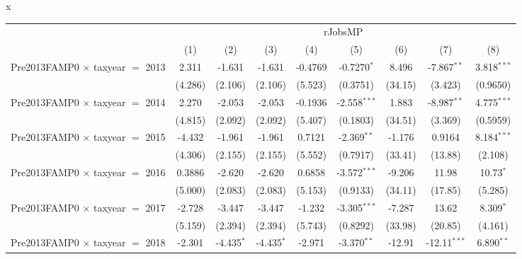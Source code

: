 x
\begingroup
\centering
\begin{tabular}{lcccccccc}
   \toprule
    & \multicolumn{8}{c}{rJobsMP}\\
                                           & (1)           & (2)           & (3)           & (4)           & (5)            & (6)           & (7)            & (8)\\  
   \midrule 
   Pre2013FAMP0 $\times$ taxyear $=$ 2013  & 2.311         & -1.631        & -1.631        & -0.4769       & -0.7270$^{*}$  & 8.496         & -7.867$^{**}$  & 3.818$^{***}$\\   
                                           & (4.286)       & (2.106)       & (2.106)       & (5.523)       & (0.3751)       & (34.15)       & (3.423)        & (0.9650)\\   
   Pre2013FAMP0 $\times$ taxyear $=$ 2014  & 2.270         & -2.053        & -2.053        & -0.1936       & -2.558$^{***}$ & 1.883         & -8.987$^{**}$  & 4.775$^{***}$\\   
                                           & (4.815)       & (2.092)       & (2.092)       & (5.407)       & (0.1803)       & (34.51)       & (3.369)        & (0.5959)\\   
   Pre2013FAMP0 $\times$ taxyear $=$ 2015  & -4.432        & -1.961        & -1.961        & 0.7121        & -2.369$^{**}$  & -1.176        & 0.9164         & 8.184$^{***}$\\   
                                           & (4.306)       & (2.155)       & (2.155)       & (5.552)       & (0.7917)       & (33.41)       & (13.88)        & (2.108)\\   
   Pre2013FAMP0 $\times$ taxyear $=$ 2016  & 0.3886        & -2.620        & -2.620        & 0.6858        & -3.572$^{***}$ & -9.206        & 11.98          & 10.73$^{*}$\\   
                                           & (5.000)       & (2.083)       & (2.083)       & (5.153)       & (0.9133)       & (34.11)       & (17.85)        & (5.285)\\   
   Pre2013FAMP0 $\times$ taxyear $=$ 2017  & -2.728        & -3.447        & -3.447        & -1.232        & -3.305$^{***}$ & -7.287        & 13.62          & 8.309$^{*}$\\   
                                           & (5.159)       & (2.394)       & (2.394)       & (5.743)       & (0.8292)       & (33.98)       & (20.85)        & (4.161)\\   
   Pre2013FAMP0 $\times$ taxyear $=$ 2018  & -2.301        & -4.435$^{*}$  & -4.435$^{*}$  & -2.971        & -3.370$^{**}$  & -12.91        & -12.11$^{***}$ & 6.890$^{**}$\\   

\end{tabular}
